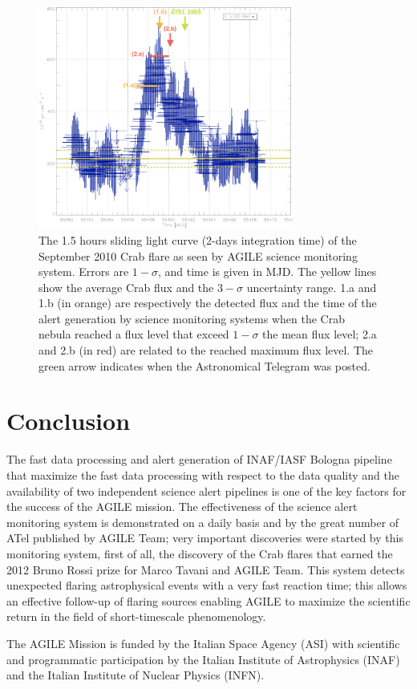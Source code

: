 \begin{figure}[t]
\centering
\includegraphics[width=0.75\textwidth]{part10/Bulgarelli_O05/O.05_2.eps}
\caption{The 1.5 hours sliding light curve (2-days integration time) of the September 2010 Crab flare as seen by AGILE science monitoring system. Errors are $1-\sigma$, and time is given in MJD. The yellow lines show the average Crab flux and the $3-\sigma$ uncertainty range. 1.a and 1.b (in orange) are respectively the detected flux and the time of the alert generation by science monitoring systems when the Crab nebula reached a flux level that exceed $1-\sigma$ the mean flux level; 2.a and 2.b (in red) are related to the reached maximum flux level. The green arrow indicates when the Astronomical Telegram was posted.} \label{fig_crab}
\end{figure}

\section{Conclusion}

The fast data processing and alert generation of INAF/IASF Bologna pipeline that maximize the fast data processing with respect to the data quality and the availability of two independent science alert pipelines is one of the key factors for the success of the AGILE mission. The effectiveness of the science alert monitoring system is demonstrated on a daily basis and by the great number of ATel published by AGILE Team; very important discoveries were started by this monitoring system, first of all, the discovery of the Crab flares that earned the 2012 Bruno Rossi prize for Marco Tavani and AGILE Team. This system detects unexpected flaring astrophysical events with a very fast reaction time; this allows an effective follow-up of flaring sources enabling AGILE to maximize the scientific return in the field of short-timescale phenomenology.

\acknowledgements The AGILE Mission is funded by the Italian Space Agency (ASI) with scientific and programmatic participation by the Italian Institute of Astrophysics (INAF) and the Italian Institute of Nuclear Physics (INFN). 



